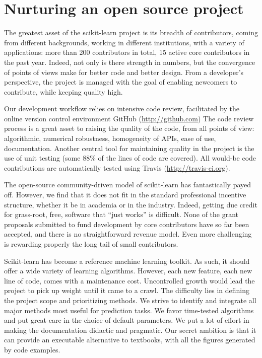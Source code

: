 \documentclass[a4paper]{article}
\begin{document}
\section{Nurturing an open source project}

The greatest asset of the scikit-learn project is its breadth of
contributors, coming from different backgrounds, working in different
institutions, with a variety of applications: more than 200 contributors in
total, 15 active core contributors in the past year. Indeed, not only
is there strength in numbers, but the convergence of points of views
make for better code and better design. From a developer's perspective, the
project is managed with the goal of enabling newcomers to contribute,
while keeping quality high.

Our development workflow relies on intensive code review,
facilitated by the online version control environment GitHub (\url{http://github.com})
The code review process is a great asset to
raising the quality of the code, from all points of view: algorithmic,
numerical robustness, homogeneity of APIs, ease of use, documentation.
Another central tool for maintaining quality in the project is the use of
unit testing (some 88\% of the lines of code are covered).
All would-be code contributions are automatically tested using Travis
(\url{http://travis-ci.org}).

The open-source community-driven model of scikit-learn has fantastically
payed off. However, we find that it does not fit in the standard
professional incentive structure, whether it be in academia or in the
industry. Indeed, getting due credit for grass-root, free, software that
``just works'' is difficult. None of the grant proposals submitted to fund
development by core contributors have so far been accepted, and there is
no straightforward revenue model. Even more challenging is rewarding
properly the long tail of small contributors.

Scikit-learn has become a reference machine learning toolkit. As such, it
should offer a wide variety of learning algorithms. However, each new
feature, each new line of code, comes with a maintenance cost.
Uncontrolled growth would lead the project to pick up weight until it
came to a crawl. The difficulty lies in defining the project scope and
prioritizing methods. We strive to identify and integrate all major
methods most useful for prediction tasks. We favor time-tested
algorithms and put great care in the choice of default parameters. We put
a lot of effort in making the documentation didactic and
pragmatic. Our
secret ambition is that it can provide an executable alternative to
textbooks, with all the figures generated by code examples.
\end{document}
